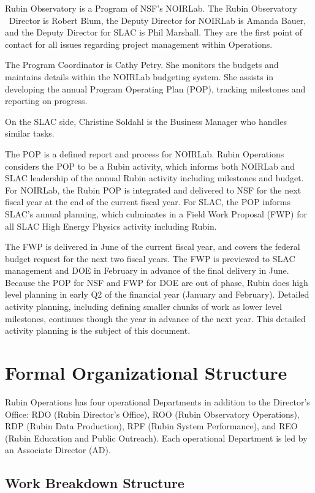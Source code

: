 Rubin Observatory is a Program of NSF's NOIRLab.
The Rubin Observatory \ \gls{Director} is Robert Blum, the Deputy \gls{Director} for NOIRLab is Amanda Bauer, and the Deputy \gls{Director} for SLAC is Phil Marshall.
They are the first point of contact for all issues regarding project management within \RO Operations.

The Program Coordinator is Cathy Petry.
She monitors the budgets and maintains details within the NOIRLab budgeting system.
She assists in developing the annual Program Operating Plan (POP), tracking milestones and reporting on progress.

On the SLAC side, Christine Soldahl is the Business Manager who handles similar tasks.

The POP is a defined report and process for NOIRLab.
Rubin Operations considers the POP to be a Rubin activity, which informs both NOIRLab and SLAC leadership of the annual Rubin activity including milestones and budget.
For NOIRLab, the Rubin POP is integrated and delivered to NSF for the next fiscal year at the end of the current fiscal year.
For SLAC, the POP informs SLAC's annual planning, which culminates in a Field Work Proposal (FWP) for all SLAC High Energy Physics activity including Rubin.

The FWP is delivered in June of the current fiscal year, and covers the federal budget request for the next two fiscal years.
The FWP is previewed to SLAC management and DOE in February in advance of the final delivery in June.
Because the POP for NSF and FWP for DOE are out of phase, Rubin does high level planning in early Q2 of the financial year (January and February).
Detailed activity planning, including defining smaller chunks of work as lower level milestones, continues though the year in advance of the next year.
This detailed activity planning is the subject of this document.

\section{Formal Organizational Structure}
\label{sec:structure}

Rubin Operations has four operational Departments in addition to the Director’s Office: RDO (Rubin Director’s Office), ROO (Rubin Observatory Operations), RDP (Rubin Data Production), RPF (Rubin System Performance), and REO (Rubin Education and Public Outreach).
Each operational Department is led by an Associate Director (AD).

\subsection{Work Breakdown Structure}
\label{sec:wbs}

